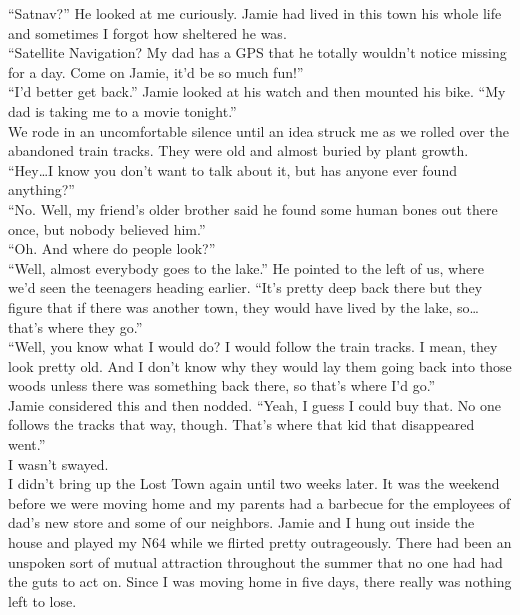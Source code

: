 \documentclass[a5paper]{scrartcl}
\begin{document}
\enquote{Satnav?} He looked at me curiously. Jamie had lived in this 
town his whole life and sometimes I forgot how sheltered he was.\\

\enquote{Satellite Navigation? My dad has a GPS that he totally wouldn't notice missing for a day. Come on Jamie, it'd be so much fun!}\\


\enquote{I'd better get back.} Jamie looked at his watch and then mounted his bike. \enquote{My dad is taking me to a movie tonight.} \\


We rode in an uncomfortable silence until an idea struck me as we rolled over the abandoned train tracks. They were old and almost buried by plant growth. \\


\enquote{Hey\dots I know you don't want to talk about it, but has anyone ever found anything?}\\


\enquote{No. Well, my friend's older brother said he found some human bones out there once, but nobody believed him.}\\


\enquote{Oh. And where do people look?}\\


\enquote{Well, almost everybody goes to the lake.} He pointed to the left of us, where we'd seen the teenagers heading earlier. \enquote{It's pretty deep back there but they figure that if there was another town, they would have lived by the lake, so\dots that's where they go.}   \\


\enquote{Well, you know what I would do? I would follow the train tracks. I mean, they look pretty old. And I don't know why they would lay them going back into those woods unless there was something back there, so that's where I'd go.}\\


Jamie considered this and then nodded. \enquote{Yeah, I guess I could buy that. No one follows the tracks that way, though. That's where that kid that disappeared went.} \\


I wasn't swayed.\\


I didn't bring up the Lost Town again until two weeks later. It was the weekend before we were moving home and my parents had a barbecue for the employees of dad's new store and some of our neighbors. Jamie and I hung out inside the house and played my N64 while we flirted pretty outrageously. There had been an unspoken sort of mutual attraction throughout the summer that no one had had the guts to act on. Since I was moving home in five days, there really was nothing left to lose. \\
\end{document}
